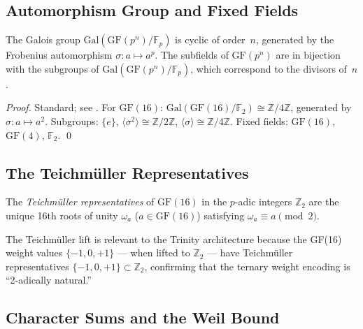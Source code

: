 \subsection{Automorphism Group and Fixed Fields}

\begin{theorem}
\label{thm:galois-finite}
The Galois group \(\mathrm{Gal}(\mathrm{GF}(p^n)/\mathbb{F}_p)\)
is cyclic of order~\(n\), generated by the Frobenius automorphism
\(\sigma\colon a\mapsto a^p\).
The subfields of \(\mathrm{GF}(p^n)\) are in bijection with the subgroups of
\(\mathrm{Gal}(\mathrm{GF}(p^n)/\mathbb{F}_p)\),
which correspond to the divisors of~\(n\).
\end{theorem}

\begin{proof}
Standard; see \cite[Theorem~2.22]{lidl_finite_fields}.
For \(\mathrm{GF}(16)\): \(\mathrm{Gal}(\mathrm{GF}(16)/\mathbb{F}_2)\cong\mathbb{Z}/4\mathbb{Z}\),
generated by \(\sigma\colon a\mapsto a^2\).
Subgroups: \(\{e\}\), \(\langle\sigma^2\rangle\cong\mathbb{Z}/2\mathbb{Z}\),
\(\langle\sigma\rangle\cong\mathbb{Z}/4\mathbb{Z}\).
Fixed fields: \(\mathrm{GF}(16)\), \(\mathrm{GF}(4)\), \(\mathbb{F}_2\).
\qed
\end{proof}

\subsection{The Teichmüller Representatives}

\begin{definition}
The \emph{Teichmüller representatives} of \(\mathrm{GF}(16)\) in the
\(p\)-adic integers \(\mathbb{Z}_2\) are the unique 16th roots of unity
\(\omega_a\) (\(a\in\mathrm{GF}(16)\)) satisfying \(\omega_a\equiv a\pmod{2}\).
\end{definition}

The Teichmüller lift is relevant to the Trinity architecture because
the GF(16) weight values \(\{-1,0,+1\}\) — when lifted to \(\mathbb{Z}_2\)
— have Teichmüller representatives \(\{-1,0,+1\}\subset\mathbb{Z}_2\),
confirming that the ternary weight encoding is ``2-adically natural.''

\subsection{Character Sums and the Weil Bound}

